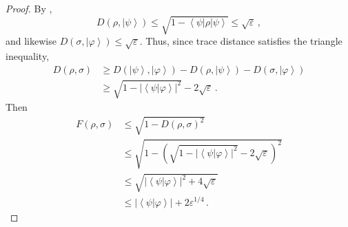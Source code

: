 \begin{proof}
By ,%
\[
D\left(  \rho,\left\vert \psi\right\rangle \right)  \leq\sqrt{1-\left\langle
\psi\right\vert \rho\left\vert \psi\right\rangle }\leq\sqrt{\varepsilon}\,,
\]
and likewise $D\left(  \sigma,\left\vert \varphi\right\rangle \right)
\leq\sqrt{\varepsilon}$. Thus, since trace distance satisfies the triangle
inequality,%
\begin{align*}
D\left(  \rho,\sigma\right)   &  \geq D\left(  \left\vert \psi\right\rangle
,\left\vert \varphi\right\rangle \right)  -D\left(  \rho,\left\vert
\psi\right\rangle \right)  -D\left(  \sigma,\left\vert \varphi\right\rangle
\right)  \\
&  \geq\sqrt{1-\left\vert \left\langle \psi|\varphi\right\rangle \right\vert
^{2}}-2\sqrt{\varepsilon}\,.
\end{align*}
Then%
\begin{align*}
F\left(  \rho,\sigma\right)   &  \leq\sqrt{1-D\left(  \rho,\sigma\right)
^{2}}\\
&  \leq\sqrt{1-\left(  \sqrt{1-\left\vert \left\langle \psi|\varphi
\right\rangle \right\vert ^{2}}-2\sqrt{\varepsilon}\right)  ^{2}}\\
&  \leq\sqrt{\left\vert \left\langle \psi|\varphi\right\rangle \right\vert
^{2}+4\sqrt{\varepsilon}}\\[1ex]
&  \leq\left\vert \left\langle \psi|\varphi\right\rangle \right\vert
+2\varepsilon^{1/4}\,.
\end{align*}

\end{proof}
